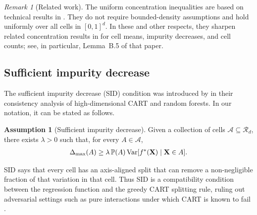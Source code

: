 \documentclass[11pt]{article}
\theoremstyle{plain}
\theoremstyle{definition}
\newtheorem{assumption}[theorem]{Assumption}
\theoremstyle{remark}
\newtheorem{remark}[theorem]{Remark}
\theoremstyle{plain}
\newcommand{\bX}{\mathbf{X}}
\renewcommand{\P}{\mathbb{P}}
\newcommand{\Var}{\textnormal{Var}}
\newcommand{\1}{\mathbbm{1}}
\begin{document}

\begin{remark}[Related work]
The uniform concentration inequalities are based on technical results in \citet{xu2026statistical}.
They do not require bounded-density assumptions and hold uniformly over all cells in $[0,1]^d$.
In these and other respects, they sharpen related concentration results in \citet{Mazumder2024} for cell means, impurity decreases, and cell counts; see, in particular, Lemma~B.5 of that paper.

\end{remark}
\subsection{Sufficient impurity decrease}
\label{sec:shared-assumptions}

The sufficient impurity decrease (SID) condition was introduced by
\citet{chi2022asymptotic} in their consistency analysis of high-dimensional CART
and random forests. In our notation, it can be stated as follows.

\begin{assumption}[Sufficient impurity decrease]
\label{assum:sid}
Given a collection of cells $\mathcal A\subseteq\mathcal R_d$, there exists
$\lambda>0$ such that, for every $A \in\mathcal A$,
\begin{align}
\label{eq:sid}
\Delta_{\max}(A)
\ge
\lambda\,\P(A)\,
\Var[f^*(\bX)\mid\bX\in A].
\end{align}
\end{assumption}

SID says that every cell has an axis-aligned split that can remove a non-negligible fraction of that variation in that cell.
Thus SID is a compatibility condition between the regression
function and the greedy CART splitting rule, ruling out adversarial settings such as pure interactions under which CART is known to fail \citep{tan2024statistical}.
\end{document}
